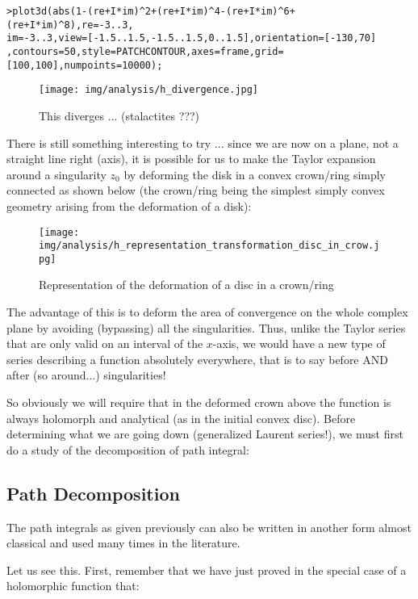 	\texttt{>plot3d(abs(1-(re+I*im)\string^2+(re+I*im)\string^4-(re+I*im)\string^6+(re+I*im)\string^8),re=-3..3,\\
im=-3..3,view=[-1.5..1.5,-1.5..1.5,0..1.5],orientation=[-130,70]\\
	,contours=50,style=PATCHCONTOUR,axes=frame,grid=[100,100],numpoints=10000);}
	
	\begin{figure}[H]
		\begin{center}
			\texttt{[image: img/analysis/h\_divergence.jpg]}
		\end{center}	
		\caption[]{This diverges ... (stalactites ???)}
	\end{figure}
	There is still something interesting to try ... since we are now on a plane, not a straight line right (axis), it is possible for us to make the Taylor expansion around a singularity $z_0$ by deforming the disk in a convex crown/ring simply connected as shown below (the crown/ring being the simplest simply convex geometry arising from the deformation of a disk):
	\begin{figure}[H]
		\begin{center}
			\texttt{[image: img/analysis/h\_representation\_transformation\_disc\_in\_crow.jpg]}
		\end{center}	
		\caption{Representation of the deformation of a disc in a crown/ring}
	\end{figure}
	The advantage of this is to deform the area of convergence on the whole complex plane by avoiding (bypassing) all the singularities. Thus, unlike the Taylor series that are only valid on an interval of the $x$-axis, we would have a new type of series describing a function absolutely everywhere, that is to say before AND after (so around...) singularities!
	
	So obviously we will require that in the deformed crown above the function is always holomorph and analytical (as in the initial convex disc). Before determining what we are going down (generalized Laurent series!), we must first do a study of the decomposition of path integral:
	
	\pagebreak
	\subsection{Path Decomposition}
	The path integrals as given previously can also be written in another form almost classical and used many times in the literature.
	
	Let us see this. First, remember that we have just proved in the special case of a holomorphic function that:
	
